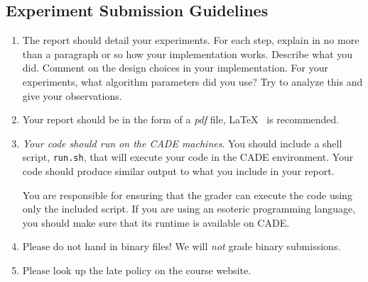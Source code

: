 \subsection*{Experiment Submission Guidelines}
\begin{enumerate}
\item The report should detail your experiments. For each step,
  explain in no more than a paragraph or so how your implementation
  works. Describe what you did. Comment on the design choices in your
  implementation. For your experiments, what algorithm parameters did
  you use? Try to analyze this and give your observations. 

\item Your report should be in the form of a \emph{pdf} file, \LaTeX~
  is recommended.

\item {\em Your code should run on the CADE machines}. You should
  include a shell script, {\tt run.sh}, that will execute your code
  in the CADE environment. Your code should produce similar output
  to what you include in your report.
  
  You are responsible for ensuring that the grader can execute the
  code using only the included script. If you are using an
  esoteric programming language, you should make sure that its
  runtime is available on CADE.

\item Please do not hand in binary files! We will {\em not} grade
  binary submissions.

\item Please look up the late policy on the course website.

\end{enumerate}

